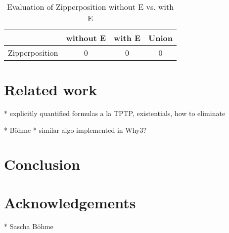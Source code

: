 \documentclass[]{ceurart}
\begin{document}
\begin{table}[ht]
\caption{Evaluation of Zipperposition without E vs. with E}
\centering\begin{tabular}{@{}lccc@{}}
   \toprule
   & without E & with E & Union \\
   \midrule
   Zipperposition & 0 & 0 & 0 \\
   \bottomrule
\end{tabular}
\end{table}

\break

\section{Related work}
\label{sec:related-work}

  * explicitly quantified formulas a la TPTP, existentials, how to eliminate

  * Böhme
  * similar algo implemented in Why3?

\section{Conclusion}
\label{sec:conclusion}



\section*{Acknowledgements}

* Sascha Böhme


\end{document}
